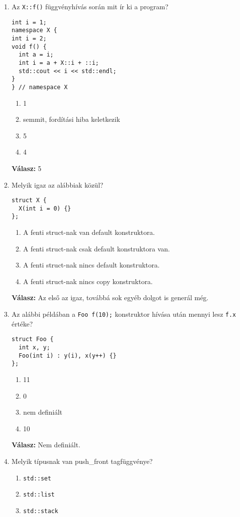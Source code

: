 \documentclass[../cpp_book/cpp_book.tex]{subfiles}
\begin{document}
\begin{enumerate}[1.)]
		\item Az \texttt{X::f()} függvényhívás során mit ír ki a program?
		\begin{lstlisting}
int i = 1;
namespace X {
int i = 2;
void f() {
  int a = i;
  int i = a + X::i + ::i;
  std::cout << i << std::endl;
}
} // namespace X
		\end{lstlisting}
		\begin{enumerate}
			\item 1
			\item semmit, fordítási hiba keletkezik
			\item 5
			\item 4
		\end{enumerate}
		\textbf{Válasz:} 5
		\item Melyik igaz az alábbiak közül?
		\begin{lstlisting}
struct X {
  X(int i = 0) {}
};
		\end{lstlisting}
		\begin{enumerate}
			\item A fenti struct-nak van default konstruktora.
			\item A fenti struct-nak csak default konstruktora van.
			\item A fenti struct-nak nincs default konstruktora.
			\item A fenti struct-nak nincs copy konstruktora.
		\end{enumerate}
		\textbf{Válasz:} Az első az igaz, továbbá sok egyéb dolgot is generál még.
		\item Az alábbi példában a \texttt{Foo f(10);} konstruktor hívása után mennyi lesz \texttt{f.x} értéke?
		\begin{lstlisting}
struct Foo {
  int x, y;
  Foo(int i) : y(i), x(y++) {}
};
		\end{lstlisting}
		\begin{enumerate}
			\item 11
			\item 0
			\item nem definiált
			\item 10
		\end{enumerate}
		\textbf{Válasz:} Nem definiált.
		\item Melyik típusnak van push\_front tagfüggvénye?
		\begin{enumerate}
			\item \texttt{std::set}
			\item \texttt{std::list}
			\item \texttt{std::stack}

\end{enumerate}
\end{enumerate}
\end{document}
